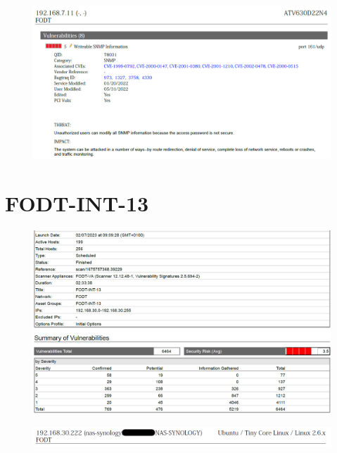 \documentclass[target=bach,aauheader=]{thud}
\begin{document}
\pagebreak

\begin{figure}[h]
    \centering
    \includegraphics[width=1\linewidth]{images/FODT-INT-06_3.png}
    \caption{}
    \label{fig:fodt-int-06_3}
\end{figure}

\pagebreak

\section{FODT-INT-13}

\begin{figure}[h]
    \centering
    \includegraphics[width=1\linewidth]{images/FODT-INT-13_1.png}
    \caption{}
    \label{fig:fodt-int-13_1}
\end{figure}

\begin{figure}[h]
    \centering
    \includegraphics[width=1\linewidth]{images/FODT-INT-13_2.png}
    \caption{}
    \label{fig:fodt-int-13_2}
\end{figure}
\end{document}
